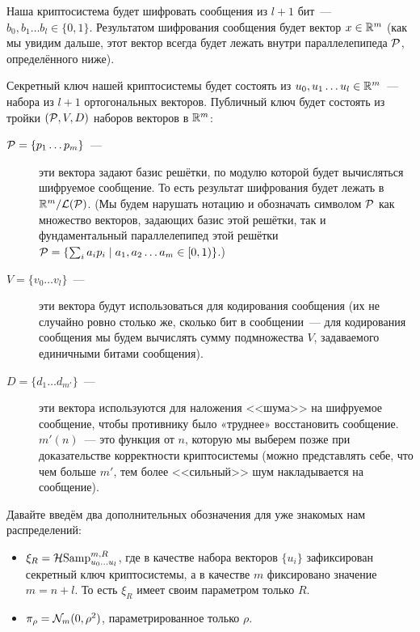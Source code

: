 \documentclass[oneside, a4paper]{article}
\theoremstyle{plain}
\theoremstyle{definition}
\theoremstyle{remark}
\newcommand\N{\ensuremath \mathcal N}
\newcommand\PP{\ensuremath \mathcal P}
\newcommand\LL{\ensuremath \mathcal L}
\newcommand\R{\ensuremath \mathbb R}
\newcommand\HS{\ensuremath \operatorname{\mathcal H Samp}}
\begin{document}
Наша криптосистема будет шифровать сообщения из $l+1$ бит~--- $b_0, b_1 \dots
b_l \in \{0,1\}$. Результатом шифрования сообщения будет вектор $x \in \R^m$
(как мы увидим дальше, этот вектор всегда будет лежать внутри параллелепипеда
$\PP$, определённого ниже).

Секретный ключ нашей криптосистемы будет состоять из $u_0, u_1 \dots u_l \in
\R^m$~--- набора из $l+1$ ортогональных векторов. Публичный ключ будет состоять
из тройки $(\PP, V, D)$ наборов векторов в $\R^m$:

\begin{description}
  \item[$\PP = \{p_1 \dots p_m\}$~---] эти вектора задают базис решётки, по
  модулю которой будет вычисляться шифруемое сообщение. То есть результат
  шифрования будет лежать в $\R^m/\LL(\PP)$. (Мы будем нарушать нотацию и
  обозначать символом $\PP$ как множество векторов, задающих базис этой решётки,
  так и фундаментальный параллелепипед этой решётки $\PP = \left \{\sum_i a_i
  p_i \mid a_1, a_2 \dots a_m \in [0, 1) \right\}$.)

  \item[$V = \{v_0 \dots v_l\}$~---] эти вектора будут использоваться для
  кодирования сообщения (их не случайно ровно столько же, сколько бит в
  сообщении~--- для кодирования сообщения мы будем вычислять сумму подмножества
  $V$, задаваемого единичными битами сообщения).

  \item[$D = \{d_1 \dots d_{m'}\}$~---] эти вектора используются для наложения
  <<шума>> на шифруемое сообщение, чтобы противнику было «труднее» восстановить
  сообщение. $m'(n)$~--- это функция от $n$, которую мы выберем позже при
  доказательстве корректности криптосистемы (можно представлять себе, что чем
  больше $m'$, тем более <<сильный>> шум накладывается на сообщение).
\end{description}

Давайте введём два дополнительных обозначения для уже знакомых нам
распределений:
\begin{itemize}
  \item $\xi_R = \HS^{m, R}_{u_0 \dots u_l}$, где в качестве набора векторов
  $\{u_i\}$ зафиксирован секретный ключ криптосистемы, а в качестве $m$
  фиксировано значение $m = n + l$. То есть $\xi_R$ имеет своим параметром
  только $R$.

  \item $\pi_\rho = \N_m(0, \rho^2)$, параметрированное только $\rho$.
\end{itemize}
\end{document}
